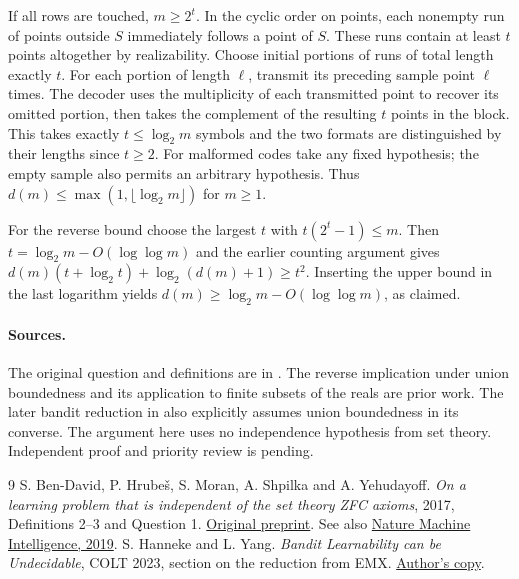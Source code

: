 \documentclass[11pt]{article}
\begin{document}
If all rows are touched, $m\ge2^t$. In the cyclic order on points, each nonempty run of points outside $S$ immediately follows a point of $S$. These runs contain at least $t$ points altogether by realizability. Choose initial portions of runs of total length exactly $t$. For each portion of length $\ell$, transmit its preceding sample point $\ell$ times. The decoder uses the multiplicity of each transmitted point to recover its omitted portion, then takes the complement of the resulting $t$ points in the block. This takes exactly $t\le\log_2 m$ symbols and the two formats are distinguished by their lengths since $t\ge2$. For malformed codes take any fixed hypothesis; the empty sample also permits an arbitrary hypothesis. Thus $d(m)\le\max(1,\lfloor\log_2 m\rfloor)$ for $m\ge1$.

For the reverse bound choose the largest $t$ with $t(2^t-1)\le m$. Then $t=\log_2m-O(\log\log m)$ and the earlier counting argument gives $d(m)(t+\log_2 t)+\log_2(d(m)+1)\ge t^2$. Inserting the upper bound in the last logarithm yields $d(m)\ge\log_2m-O(\log\log m)$, as claimed.

\paragraph{Sources.} The original question and definitions are in \cite{emx}. The reverse implication under union boundedness and its application to finite subsets of the reals are prior work. The later bandit reduction in \cite{band} also explicitly assumes union boundedness in its converse. The argument here uses no independence hypothesis from set theory. Independent proof and priority review is pending.
\begin{thebibliography}{9}
 S. Ben-David, P. Hrube\v{s}, S. Moran, A. Shpilka and A. Yehudayoff. \emph{On a learning problem that is independent of the set theory ZFC axioms}, 2017, Definitions 2--3 and Question 1. \href{https://arxiv.org/abs/1711.05195v1}{Original preprint}. See also \href{https://doi.org/10.1038/s42256-018-0002-3}{Nature Machine Intelligence, 2019}.
 S. Hanneke and L. Yang. \emph{Bandit Learnability can be Undecidable}, COLT 2023, section on the reduction from EMX. \href{https://web.ics.purdue.edu/~hanneke/docs/2023/MinimaxBandits.pdf}{Author's copy}.
\end{thebibliography}
\end{document}
